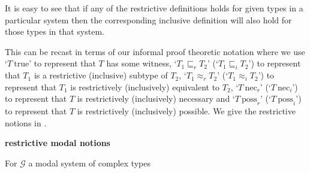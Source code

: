 \begin{shaded}
It is easy to see that if any of the restrictive definitions holds for
given types in a particular system then the corresponding inclusive
definition will also hold for those types in that system.

This can be recast in terms of our informal proof theoretic notation
where we use `$T\ \mathrm{true}$' to represent that $T$ has some
witness, `$T_1\sqsubseteq_rT_2$' (`$T_1\sqsubseteq_iT_2$') to
represent that $T_1$ is a restrictive (inclusive) subtype of $T_2$,
`$T_1\approx_rT_2$' (`$T_1\approx_iT_2$') to represent that $T_1$ is
restrictively (inclusively) equivalent to $T_2$, `$T\ \mathrm{nec}_r$'
(`$T\ \mathrm{nec}_i$') to represent that $T$ is restrictively
(inclusively) necessary and `$T\ \mathrm{poss}_r$' (`$T\
\mathrm{poss}_i$') to represent that $T$ is restrictively
(inclusively) possible.  We give the restrictive notions in \nexteg{}.
\begin{ex} 
  \textbf{restrictive modal notions}

  For $\mathcal{G}$ a modal system of complex types
  \begin{subex} 
 
  \item
    \begin{prooftree}
      \hypo{[\Gamma\in\mathcal{G}]}
    \end{prooftree}
    
 
  \item
    \begin{prooftree}
    \end{prooftree}

    
  \item
    \begin{prooftree}
      \hypo{[\Gamma\in\mathcal{G}]}
    \end{prooftree}

    
  \item
    \begin{prooftree}
    \end{prooftree}
    

\end{subex}
\end{ex}
\end{shaded}
